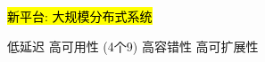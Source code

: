 
\begin{frame}{}
  \begin{center}
    {\hl{\Large 新平台: 大规模分布式系统}}
  \end{center}


  \pause
  \vspace{0.10cm}
  \begin{center}
    低延迟 \quad 高可用性 {\small (4个9)} \quad 高容错性 \quad 高可扩展性
  \end{center}

\end{frame}
